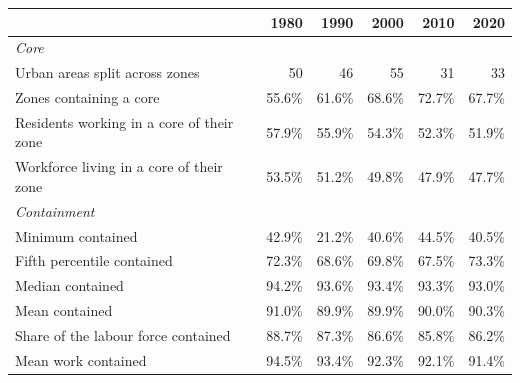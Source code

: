 \begin{tabular}{lrrrrr}
\hline\hline
& 1980 & 1990 & 2000 & 2010 & 2020 \\
\hline
\multicolumn{6}{l}{\emph{Core}} \\
\quad Urban areas split across zones & 50 & 46 & 55 & 31 & 33 \\
\quad Zones containing a core & 55.6\% & 61.6\% & 68.6\% & 72.7\% & 67.7\% \\
\quad Residents working in a core of their zone & 57.9\% & 55.9\% & 54.3\% & 52.3\% & 51.9\% \\
\quad Workforce living in a core of their zone & 53.5\% & 51.2\% & 49.8\% & 47.9\% & 47.7\% \\[3pt]
\multicolumn{6}{l}{\emph{Containment}} \\
\quad Minimum contained & 42.9\% & 21.2\% & 40.6\% & 44.5\% & 40.5\% \\
\quad Fifth percentile contained & 72.3\% & 68.6\% & 69.8\% & 67.5\% & 73.3\% \\
\quad Median contained & 94.2\% & 93.6\% & 93.4\% & 93.3\% & 93.0\% \\
\quad Mean contained & 91.0\% & 89.9\% & 89.9\% & 90.0\% & 90.3\% \\
\quad Share of the labour force contained & 88.7\% & 87.3\% & 86.6\% & 85.8\% & 86.2\% \\
\quad Mean work contained & 94.5\% & 93.4\% & 92.3\% & 92.1\% & 91.4\% \\
\hline\hline
\end{tabular}
